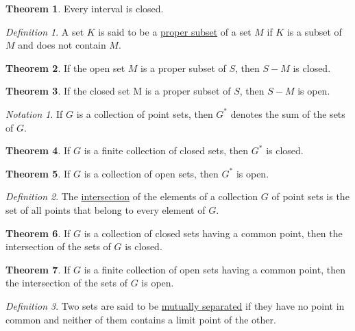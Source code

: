 \documentclass[12pt, oneside, letter] {amsart}
\theoremstyle {definition}
\newtheorem {thm} {Theorem}
\theoremstyle {remark}
\newtheorem* {defn} {Definition}
\newtheorem* {note} {Notation}
\begin{document}
\begin{thm}
  Every interval is closed.
\end{thm}

\begin{defn}
  A set $K$ is said to be a \underline {proper subset} of a set $M$ if
  $K$ is a subset of $M$ and does not contain $M$.
\end{defn}

\begin{thm}
  If the open set $M$ is a proper subset of $S$, then $S - M$ is
  closed.
\end{thm}

\begin{thm}
  If the closed set M is a proper subset of $S$, then $S - M$ is open.
\end{thm}

\begin{note}
  If $G$ is a collection of point sets, then $G^*$ denotes the sum of
  the sets of $G$.
\end{note}

\begin{thm}
  If $G$ is a finite collection of closed sets, then $G^*$ is closed.
\end{thm}

\begin{thm}
  If $G$ is a collection of open sets, then $G^*$ is open.
\end{thm}

\begin{defn}
  The \underline {intersection} of the elements of a collection $G$ of
  point sets is the set of all points that belong to every element of
  $G$.
\end{defn}

\begin{thm}
  If $G$ is a collection of closed sets having a common point, then
  the intersection of the sets of $G$ is closed.
\end{thm}

\begin{thm}
  If $G$ is a finite collection of open sets having a common point,
  then the intersection of the sets of $G$ is open.
\end{thm}

\begin{defn}
  Two sets are said to be \underline {mutually separated} if they have
  no point in common and neither of them contains a limit point of the
  other.
\end{defn}
\end{document}
